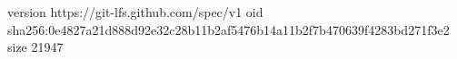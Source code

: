 version https://git-lfs.github.com/spec/v1
oid sha256:0e4827a21d888d92e32c28b11b2af5476b14a11b2f7b470639f4283bd271f3e2
size 21947
